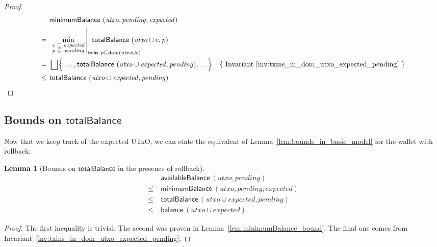 \documentclass{article}
\DeclareMathOperator{\dom}{dom}
\DeclareMathOperator*{\minimum}{min}
\newtheorem{lemma}{Lemma}[section] %
\numberwithin{equation}{lemma}
\begin{document}
\begin{proof}
\begin{align*}
    & ~ \mathsf{minimumBalance} ~ (\mathit{utxo}, \mathit{pending}, \mathit{expected}) \\
=   & ~ \left.
        \minimum_{\begin{smallmatrix}
                    e & \sqsubseteq & \mathit{expected} \\
                    p & \subseteq   & \mathit{pending}
                  \end{smallmatrix}}
        \right|_{\mathrlap{\mathsf{txins} ~ p \subseteq \dom(\mathit{utxo} \cup e)}}
        ~ \mathsf{totalBalance} ~ (\mathit{utxo} \cup e, p) \\
=   & ~ \bigsqcup \Bigr\{ \ldots, \mathsf{totalBalance} ~ (\mathit{utxo} \cup \mathit{expected}, \mathit{pending}), \ldots \Bigr\}
    & \text{\{ Invariant~\ref{inv:txins_in_dom_utxo_expected_pending} \}} \\
\le & ~ \mathsf{totalBalance} ~ (\mathit{utxo} \cup \mathit{expected}, \mathit{pending})
\end{align*}
\end{proof}

\subsection{Bounds on $\mathsf{totalBalance}$}

Now that we keep track of the expected UTxO, we can state the equivalent
of Lemma~\ref{lem:bounds_in_basic_model} for the wallet with rollback:

\begin{lemma}[Bounds on $\mathsf{totalBalance}$ in the presence of rollback]
\begin{align*}
    & ~ \mathsf{availableBalance} ~ (\mathit{utxo}, \mathit{pending}) \\
\le & ~ \mathsf{minimumBalance} ~ (\mathit{utxo}, \mathit{pending}, \mathit{expected}) \\
\le & ~ \mathsf{totalBalance} ~ (\mathit{utxo} \cup \mathit{expected}, \mathit{pending}) \\
\le & ~ \mathsf{balance} ~ (\mathit{utxo} \cup \mathit{expected})
\end{align*}
\label{lem:bounds_in_rollback_model}
\end{lemma}

\begin{proof}
The first inequality is trivial. The second was proven in
Lemma~\ref{lem:minimumBalance_bound}. The final one comes from
Invariant~\ref{inv:txins_in_dom_utxo_expected_pending}.
\end{proof}
\end{document}
